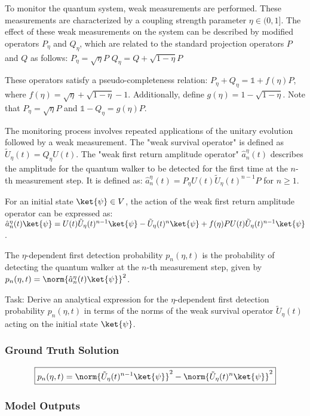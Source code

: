 \documentclass[10pt]{article}
\begin{document}
To monitor the quantum system, weak measurements are performed. These measurements are characterized by a coupling strength parameter $\eta \in (0,1]$. The effect of these weak measurements on the system can be described by modified operators $P_{\eta}$ and $Q_{\eta}$, which are related to the standard projection operators $P$ and $Q$ as follows:
$P_{\eta} = \sqrt{\eta}P$
$Q_{\eta} = Q + \sqrt{1-\eta}P$

These operators satisfy a pseudo-completeness relation: $P_{\eta} + Q_{\eta} = \mathds{1} + f(\eta)P$, where $f(\eta) = \sqrt{\eta} + \sqrt{1-\eta} - 1$.
Additionally, define $g(\eta) = 1 - \sqrt{1-\eta}$. Note that $P_{\eta} = \sqrt{\eta}P$ and $\mathds{1} - Q_{\eta} = g(\eta)P$.

The monitoring process involves repeated applications of the unitary evolution followed by a weak measurement. The "weak survival operator" is defined as $\tilde{U}_{\eta}(t) = Q_{\eta}U(t)$.
The "weak first return amplitude operator" $\hat{a}_n^{\eta}(t)$ describes the amplitude for the quantum walker to be detected for the first time at the $n$-th measurement step. It is defined as:
$\hat{a}_n^{\eta}(t) = P_{\eta} U(t) \tilde{U}_{\eta}(t)^{n-1} P$ for $n \geq 1$.

For an initial state $\ket{\psi} \in V$, the action of the weak first return amplitude operator can be expressed as:
$\hat{a}_n^{\eta}(t)\ket{\psi} = U(t) \tilde{U}_{\eta}(t)^{n-1}\ket{\psi} - \tilde{U}_{\eta}(t)^n\ket{\psi} + f(\eta) P U(t) \tilde{U}_{\eta}(t)^{n-1}\ket{\psi}$.

The $\eta$-dependent first detection probability $p_n(\eta,t)$ is the probability of detecting the quantum walker at the $n$-th measurement step, given by $p_n(\eta,t) = \norm{\hat{a}_n^{\eta}(t)\ket{\psi}}^2$.

Task:
Derive an analytical expression for the $\eta$-dependent first detection probability $p_n(\eta,t)$ in terms of the norms of the weak survival operator $\tilde{U}_{\eta}(t)$ acting on the initial state $\ket{\psi}$.

\subsubsection*{Ground Truth Solution}
\[ \boxed{p_n(\eta,t) = \norm{\tilde{U}_{\eta}(t)^{n-1}\ket{\psi}}^2 - \norm{\tilde{U}_{\eta}(t)^n\ket{\psi}}^2} \]

\subsubsection*{Model Outputs}
\end{document}
